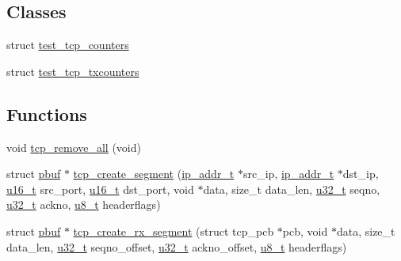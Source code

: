 \subsection*{Classes}
\begin{DoxyCompactItemize}
\item 
struct \hyperlink{structtest__tcp__counters}{test\+\_\+tcp\+\_\+counters}
\item 
struct \hyperlink{structtest__tcp__txcounters}{test\+\_\+tcp\+\_\+txcounters}
\end{DoxyCompactItemize}
\subsection*{Functions}
\begin{DoxyCompactItemize}
\item 
void \hyperlink{openmote-cc2538_2lwip_2test_2unit_2tcp_2tcp__helper_8h_ab5eb6956494f1deb9a97569d4b95ef6a}{tcp\+\_\+remove\+\_\+all} (void)
\item 
struct \hyperlink{structpbuf}{pbuf} $\ast$ \hyperlink{openmote-cc2538_2lwip_2test_2unit_2tcp_2tcp__helper_8h_aa6f4b7b087e8641f6c178d8752cc4fab}{tcp\+\_\+create\+\_\+segment} (\hyperlink{native_2lwip_2src_2include_2lwip_2ip__addr_8h_a88b43639738c4de2d3cd22e3a1fd7696}{ip\+\_\+addr\+\_\+t} $\ast$src\+\_\+ip, \hyperlink{native_2lwip_2src_2include_2lwip_2ip__addr_8h_a88b43639738c4de2d3cd22e3a1fd7696}{ip\+\_\+addr\+\_\+t} $\ast$dst\+\_\+ip, \hyperlink{group__compiler__abstraction_ga77570ac4fcab86864fa1916e55676da2}{u16\+\_\+t} src\+\_\+port, \hyperlink{group__compiler__abstraction_ga77570ac4fcab86864fa1916e55676da2}{u16\+\_\+t} dst\+\_\+port, void $\ast$data, size\+\_\+t data\+\_\+len, \hyperlink{group__compiler__abstraction_ga4c14294869aceba3ef9d4c0c302d0f33}{u32\+\_\+t} seqno, \hyperlink{group__compiler__abstraction_ga4c14294869aceba3ef9d4c0c302d0f33}{u32\+\_\+t} ackno, \hyperlink{group__compiler__abstraction_ga4caecabca98b43919dd11be1c0d4cd8e}{u8\+\_\+t} headerflags)
\item 
struct \hyperlink{structpbuf}{pbuf} $\ast$ \hyperlink{openmote-cc2538_2lwip_2test_2unit_2tcp_2tcp__helper_8h_a53b3207c8e960cdad9af044b0606a55b}{tcp\+\_\+create\+\_\+rx\+\_\+segment} (struct tcp\+\_\+pcb $\ast$pcb, void $\ast$data, size\+\_\+t data\+\_\+len, \hyperlink{group__compiler__abstraction_ga4c14294869aceba3ef9d4c0c302d0f33}{u32\+\_\+t} seqno\+\_\+offset, \hyperlink{group__compiler__abstraction_ga4c14294869aceba3ef9d4c0c302d0f33}{u32\+\_\+t} ackno\+\_\+offset, \hyperlink{group__compiler__abstraction_ga4caecabca98b43919dd11be1c0d4cd8e}{u8\+\_\+t} headerflags)

\end{DoxyCompactItemize}
